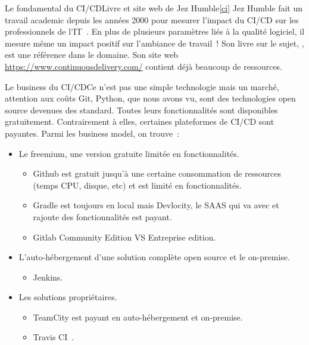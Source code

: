 \documentclass{beamer}
\begin{document}
    \begin{frame}{Le fondamental du CI/CD}{Livre et site web de Jez Humble\cref{ci}}
        \transdissolve
        Jez Humble fait un travail academic depuis les années 2000 pour mesurer l'impact du CI/CD sur les professionnels de l'IT~.
        \bigbreak
        En plus de plusieurs paramètres liés à la qualité logiciel, il mesure même un impact positif sur l'ambiance de travail~!
        \bigbreak
        Son livre sur le sujet, , est une référence dans le domaine.
        Son site web \url{https://www.continuousdelivery.com/} contient déjà beaucoup de ressources.
    \end{frame}

    \begin{frame}{Le business du CI/CD}{Ce n'est pas une simple technologie mais un marché, attention aux coûts}
        \transdissolve
        Git, Python, que nous avons vu, sont des technologies open source devenues des standard.
        Toutes leurs fonctionnalités sont disponibles gratuitement.
        Contrairement à elles, certaines plateformes de CI/CD sont payantes.
        \bigbreak
        Parmi les business model, on trouve~:
        \begin{itemize}
            \item Le freemium, une version gratuite limitée en fonctionnalités.
            \begin{itemize}
                \item Github est gratuit jusqu'à une certaine consommation de ressources (temps CPU, disque, etc) et est limité en fonctionnalités.
                \item Gradle est toujours  en local mais Devlocity, le SAAS qui va avec et rajoute des fonctionnalités est payant.
                \item Gitlab Community Edition VS Entreprise edition.
            \end{itemize}
            \item L'auto-hébergement d'une solution complète open source et le on-premise.
            \begin{itemize}
                \item Jenkins.
            \end{itemize}
            \item Les solutions propriétaires.
            \begin{itemize}
                \item TeamCity est payant en auto-hébergement et on-premise.
                \item Travis CI~.
            \end{itemize}
        \end{itemize}
    \end{frame}
\end{document}
